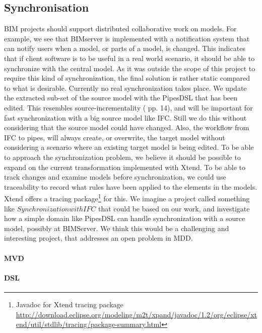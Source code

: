\subsection{Synchronisation}
    BIM projects should support distributed collaborative work on models. For example, we see that BIMserver is implemented with a notification system that can notify users when a model, or parts of a model, is changed. This indicates that if client software is to be useful in a real world scenario, it should be able to synchronize with the central model. As it was outside the scope of this project to require this kind of synchronization, the final solution is rather static compared to what is desirable. Currently no real synchronization takes place. We update the extracted sub-set of the source model with the PipesDSL that has been edited. This resembles source-incrementality (\cite{czarnecki06} pp. 14), and will be important for fast synchronization with a big source model like IFC. Still we do this without considering that the source model could have changed. Also, the workflow from IFC to pipes, will always create, or overwrite, the target model without considering a scenario where an existing target model is being edited. To be able to approach the synchronization problem, we believe it should be possible to expand on the current transformation implemented with Xtend. To be able to track changes and examine models before synchronization, we could use traceability\cite{czarnecki06} to record what rules have been applied to the elements in the models. Xtend offers a tracing package\footnote{Javadoc for Xtend tracing package \url{http://download.eclipse.org/modeling/m2t/xpand/javadoc/1.2/org/eclipse/xtend/util/stdlib/tracing/package-summary.html}} for this. We imagine a project called something like $Synchronization with IFC$ that could be based on our work, and investigate how a simple domain like PipesDSL can handle synchronization with a source model, possibly at BIMServer. We think this would be a challenging and interesting project, that addresses an open problem in MDD.

\paragraph{MVD}

\paragraph{DSL}

